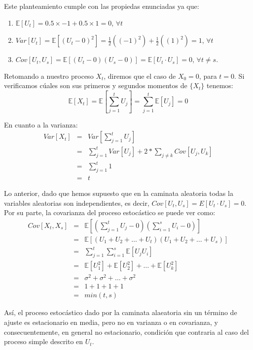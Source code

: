 \documentclass[
  a4paper,
]{article}
\begin{document}
Este planteamiento cumple con las propiedas enunciadas ya que:

\begin{enumerate}
    \item $\mathbb{E}[U_t] = 0.5 \times -1 + 0.5 \times 1 = 0$, $\forall t$
    \item $Var[U_t] = \mathbb{E}[(U_t - 0)^2] = \frac{1}{2}((-1)^2) + \frac{1}{2}((1)^2) = 1$, $\forall t$
    \item $Cov[U_t,U_s] = \mathbb{E}[(U_t - 0)(U_s - 0)] = \mathbb{E}[U_t \cdot U_s] = 0$, $\forall t \neq s$.
\end{enumerate}

Retomando a nuestro proceso \(X_t\), diremos que el caso de \(X_0 = 0\),
para \(t = 0\). Si verificamos cúales son sus primeros y segundos
momentos de \(\{X_t\}\) tenemos: \[
    \mathbb{E}[X_t] = \mathbb{E}\left[ \sum^t_{j=1} U_j \right] = \sum^t_{j=1} \mathbb{E}[U_j] = 0
\]

En cuanto a la varianza: \begin{eqnarray}
    Var[X_t] & = & Var \left[ \sum^t_{j=1} U_j \right] \nonumber \\
    & = & \sum^t_{j=1} Var[U_j] + 2 * \sum_{j \neq k} Cov[U_j,U_k] \nonumber \\
    & = & \sum^t_{j=1} 1 \nonumber \\
    & = & t    
\end{eqnarray}

Lo anterior, dado que hemos supuesto que en la caminata aleatoria todas
la variables aleatorias son independientes, es decir,
\(Cov[U_t,U_s] = E[U_t \cdot U_s] = 0\). Por su parte, la covarianza del
proceso estocástico se puede ver como: \begin{eqnarray*}
    Cov[X_t,X_s] & = & \mathbb{E} \left[ \left( \sum^t_{j=1} U_j - 0 \right) \left( \sum^s_{i=1} U_i - 0 \right) \right] \\
    & = & \mathbb{E}[(U_1 + U_2 + \ldots + U_t)(U_1 + U_2 + \ldots + U_s)] \\
    & = & \sum^t_{j=1} \sum^s_{i=1} \mathbb{E}[U_j U_i] \\
    & = & \mathbb{E}[U^2_1] + \mathbb{E}[U^2_2] + \ldots + \mathbb{E}[U^2_k] \\
    & = & \sigma^2 + \sigma^2 + \ldots + \sigma^2 \\
    & = & 1 + 1 + 1 + 1 \\
    & = & min(t,s)
\end{eqnarray*}

Así, el proceso estocástico dado por la caminata alaeatoria sin un
término de ajuste es estacionario en media, pero no en varianza o en
covarianza, y consecuentemente, en general no estacionario, condición
que contraria al caso del proceso simple descrito en \(U_t\).
\end{document}
